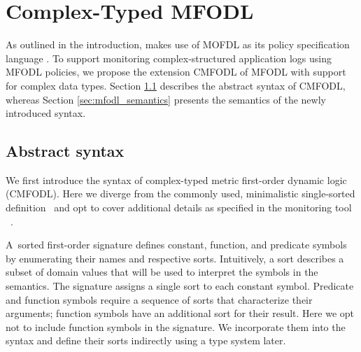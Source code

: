 \chapter{Complex-Typed MFODL}
\label{chap:complex_data_types}

As outlined in the introduction, \MonPoly makes use of MOFDL as its policy specification language \cite{basinMonPolyMonitoringTool2017}. To support monitoring complex-structured application logs using MFODL policies, we propose the extension CMFODL of MFODL with support for complex data types. Section \ref{sec:extensions_mfold_syntax} describes the abstract syntax of CMFODL, whereas Section \ref{sec:mfodl_semantics} presents the semantics of the newly introduced syntax.

\section{Abstract syntax}
\label{sec:extensions_mfold_syntax}
We first introduce the syntax of complex-typed metric first-order dynamic logic (CMFODL). Here we diverge from the commonly used, minimalistic single-sorted definition~\cite{basinMonitoringMetricFirstorder2015} and opt to cover additional details as specified in the monitoring tool \MonPoly~\cite{basinMonPolyMonitoringTool2017}.

A~sorted first-order signature defines constant, function,
and predicate symbols by enumerating their names and respective sorts.
Intuitively, a sort describes a subset of domain values
that will be used to interpret the symbols in the semantics.
The signature assigns a single sort to each constant symbol.
Predicate and function symbols require a sequence of sorts that
characterize their arguments; function symbols have an additional sort for their result.
Here we opt not to include function symbols in the signature. We incorporate
them into the syntax and define their sorts indirectly using a type system later.

